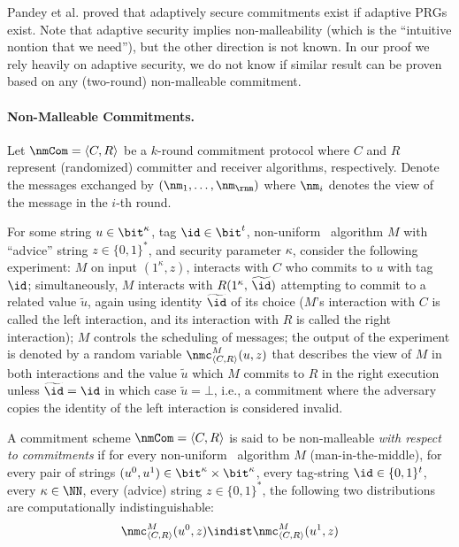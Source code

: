 Pandey et al. \cite{C:PanPasVai08} proved that adaptively secure commitments exist if adaptive PRGs exist. Note that adaptive security implies non-malleability (which is the ``intuitive nontion that we need''), but the other direction is not known. In our proof we rely heavily on adaptive security, we do not know if similar result can be proven based on any (two-round) non-malleable commitment.

\iffalse
  \paragraph{Non-Malleable Commitments.}\label{nmcomsec}
  Let $\nmCom=\langle C,R\rangle$  be a $k$-round commitment protocol
  where $C$ and $R$ represent (randomized) committer and receiver
  algorithms, respectively.  Denote the messages exchanged by
  $(\nm_1,\ldots,\nm_{\rnm})$ where $\nm_i$ denotes the view of the
  message in the $i$-th round.

  For some string $u\in\bit^\kappa$,  tag $\id\in\bit^t$, non-uniform
  \ppt\ algorithm $M$ with ``advice'' string $z\in\{0,1\}^*$, and
  security parameter $\kappa$, consider the following experiment: $M$ on
  input $(1^\kappa,z)$, interacts with $C$ who commits to $u$ with tag
  $\id$; simultaneously, $M$ interacts with
  $R({1^\kappa,\,\widetilde{\id}})$ attempting to commit to a related
  value $\widetilde{u}$, again using identity $\widetilde{\id}$ of its
  choice ($M$'s interaction with $C$ is called the left interaction, and
  its interaction with $R$ is called the right interaction); $M$
  controls the scheduling of messages; the output of the experiment is
  denoted by a random variable $\nmc^{M}_{\langle C,R\rangle}(u, z)$
  that describes the view of $M$ in both interactions and the value
  $\widetilde{u}$ which $M$ commits to $R$ in the right execution unless
  $\widetilde{\id}=\id$ in which case $\widetilde{u}=\bot$, i.e., a
  commitment where the adversary copies the identity of the left
  interaction is considered invalid.



  \label{def:tag-nmcom} A
  commitment scheme $\nmCom=\langle C,R\rangle$ is said to be
  non-malleable {\em with respect to commitments} if for every
  non-uniform \ppt\ algorithm $M$ (man-in-the-middle), for every pair of
  strings $(u^0, u^1)\in\bit^\kappa\times\bit^\kappa$, every tag-string
  $\id \in\{0,1\}^{t}$, every $\kappa\in\NN$, every (advice) string
  $z\in\{0,1\}^{*}$, the following two distributions are computationally
  indistinguishable:
  $$\nmc^{M}_{\langle C,R\rangle}(u^0, z)\indist\nmc^{M}_{\langle
   C,R\rangle}(u^1, z)$$

